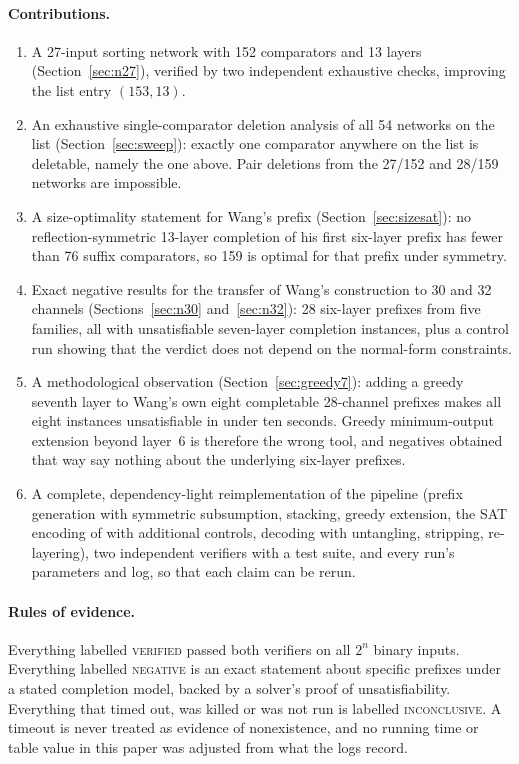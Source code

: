 \documentclass[11pt,a4paper]{article}
\theoremstyle{plain}
\theoremstyle{definition}
\theoremstyle{remark}
\newcommand{\VER}{\textsc{verified}}
\newcommand{\NEG}{\textsc{negative}}
\newcommand{\INC}{\textsc{inconclusive}}
\begin{document}
\paragraph{Contributions.}
\begin{enumerate}
\item A 27-input sorting network with 152 comparators and 13 layers (Section~\ref{sec:n27}), verified by two independent exhaustive checks, improving the list entry $(153,13)$.
\item An exhaustive single-comparator deletion analysis of all 54 networks on the list (Section~\ref{sec:sweep}): exactly one comparator anywhere on the list is deletable, namely the one above. Pair deletions from the 27/152 and 28/159 networks are impossible.
\item A size-optimality statement for Wang's prefix (Section~\ref{sec:sizesat}): no reflection-symmetric 13-layer completion of his first six-layer prefix has fewer than 76 suffix comparators, so 159 is optimal for that prefix under symmetry.
\item Exact negative results for the transfer of Wang's construction to 30 and 32 channels (Sections~\ref{sec:n30} and~\ref{sec:n32}): 28 six-layer prefixes from five families, all with unsatisfiable seven-layer completion instances, plus a control run showing that the verdict does not depend on the normal-form constraints.
\item A methodological observation (Section~\ref{sec:greedy7}): adding a greedy seventh layer to Wang's own eight completable 28-channel prefixes makes all eight instances unsatisfiable in under ten seconds. Greedy minimum-output extension beyond layer~6 is therefore the wrong tool, and negatives obtained that way say nothing about the underlying six-layer prefixes.
\item A complete, dependency-light reimplementation of the pipeline (prefix generation with symmetric subsumption, stacking, greedy extension, the SAT encoding of \cite{CCEMS19} with additional controls, decoding with untangling, stripping, re-layering), two independent verifiers with a test suite, and every run's parameters and log, so that each claim can be rerun.
\end{enumerate}

\paragraph{Rules of evidence.}
Everything labelled \VER{} passed both verifiers on all $2^n$ binary inputs. Everything labelled \NEG{} is an exact statement about specific prefixes under a stated completion model, backed by a solver's proof of unsatisfiability. Everything that timed out, was killed or was not run is labelled \INC{}. A timeout is never treated as evidence of nonexistence, and no running time or table value in this paper was adjusted from what the logs record.
\end{document}

